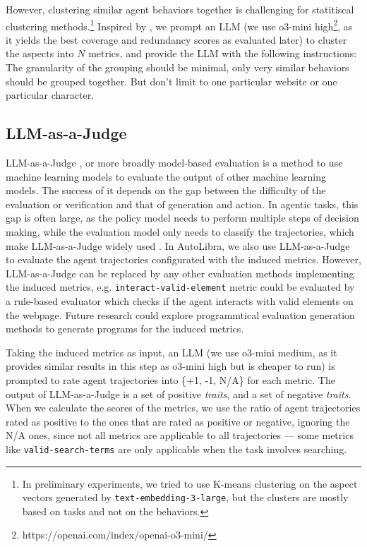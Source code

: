 However, clustering similar agent behaviors together is challenging for statitiscal clustering methods.\footnote{
    In preliminary experiments, we tried to use K-means clustering on the aspect vectors generated by \texttt{text-embedding-3-large},
    but the clusters are mostly based on tasks and not on the behaviors.
}
Inspired by \citet{viswanathan2024large,lam2024concept}, we prompt an LLM
(we use o3-mini high\footnote{https://openai.com/index/openai-o3-mini/}, as it yields the best coverage and redundancy scores
    as evaluated later) to cluster the aspects 
into $N$ metrics, and provide the LLM with the following instructions:
The granularity of the grouping should be minimal, only very similar behaviors should be grouped together.
But don't limit to one particular website or one particular character.


\subsection{LLM-as-a-Judge}
\label{sec:llm-judge}

LLM-as-a-Judge \citep{zheng2023judging},
or more broadly model-based evaluation 
\citep{zhang2019bertscore,celikyilmaz2021evaluationtextgenerationsurvey}
is a method to use machine learning models to evaluate the output of other machine learning models.
The success of it depends on the gap between the difficulty of the evaluation or verification and 
that of generation and action. 
In agentic tasks, this gap is often large, as the policy model needs to perform 
multiple steps of decision making, while the evaluation model only needs to
classify the trajectories, which make LLM-as-a-Judge widely used \citep{zhouwebarena,he2024webvoyager,zhousotopia}.
In AutoLibra, we also use LLM-as-a-Judge to
evaluate the agent trajectories configurated with the induced metrics. However, LLM-as-a-Judge
can be replaced by any other evaluation methods implementing the induced metrics,
e.g. \texttt{interact-valid-element} metric
could be evaluated by a rule-based evaluator which checks if the agent
interacts with valid elements on the webpage. Future research could explore
programmtical evaluation generation methods \citep{maeureka} to generate 
programs for the induced metrics.

Taking the induced metrics as input, an LLM (we use o3-mini medium,
as it provides similar results in this step as o3-mini high
but is cheaper to run) is prompted to rate agent trajectories into
\{+1, -1, N/A\} for each metric. The output of LLM-as-a-Judge is a set of
positive \emph{traits}, and a set of negative \emph{traits}. When we calculate the scores of 
the metrics, we use the ratio of agent trajectories rated as positive
to the ones that are rated as positive or negative, ignoring the N/A ones,
since not all metrics are applicable to all trajectories ---
some metrics like \texttt{valid-search-terms} are only applicable when the task
involves searching. 

